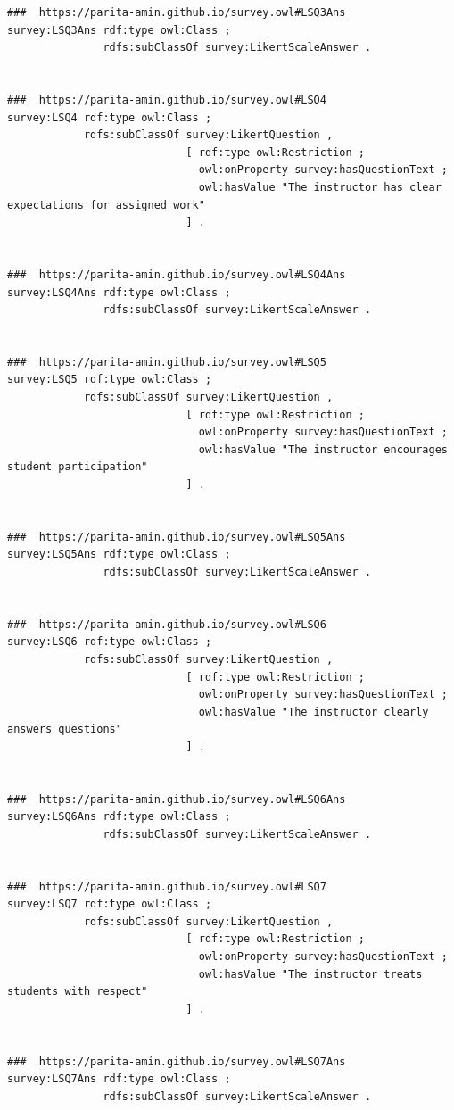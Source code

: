 \begin{lstlisting}
###  https://parita-amin.github.io/survey.owl#LSQ3Ans
survey:LSQ3Ans rdf:type owl:Class ;
               rdfs:subClassOf survey:LikertScaleAnswer .


###  https://parita-amin.github.io/survey.owl#LSQ4
survey:LSQ4 rdf:type owl:Class ;
            rdfs:subClassOf survey:LikertQuestion ,
                            [ rdf:type owl:Restriction ;
                              owl:onProperty survey:hasQuestionText ;
                              owl:hasValue "The instructor has clear expectations for assigned work"
                            ] .


###  https://parita-amin.github.io/survey.owl#LSQ4Ans
survey:LSQ4Ans rdf:type owl:Class ;
               rdfs:subClassOf survey:LikertScaleAnswer .


###  https://parita-amin.github.io/survey.owl#LSQ5
survey:LSQ5 rdf:type owl:Class ;
            rdfs:subClassOf survey:LikertQuestion ,
                            [ rdf:type owl:Restriction ;
                              owl:onProperty survey:hasQuestionText ;
                              owl:hasValue "The instructor encourages student participation"
                            ] .


###  https://parita-amin.github.io/survey.owl#LSQ5Ans
survey:LSQ5Ans rdf:type owl:Class ;
               rdfs:subClassOf survey:LikertScaleAnswer .


###  https://parita-amin.github.io/survey.owl#LSQ6
survey:LSQ6 rdf:type owl:Class ;
            rdfs:subClassOf survey:LikertQuestion ,
                            [ rdf:type owl:Restriction ;
                              owl:onProperty survey:hasQuestionText ;
                              owl:hasValue "The instructor clearly answers questions"
                            ] .


###  https://parita-amin.github.io/survey.owl#LSQ6Ans
survey:LSQ6Ans rdf:type owl:Class ;
               rdfs:subClassOf survey:LikertScaleAnswer .


###  https://parita-amin.github.io/survey.owl#LSQ7
survey:LSQ7 rdf:type owl:Class ;
            rdfs:subClassOf survey:LikertQuestion ,
                            [ rdf:type owl:Restriction ;
                              owl:onProperty survey:hasQuestionText ;
                              owl:hasValue "The instructor treats students with respect"
                            ] .


###  https://parita-amin.github.io/survey.owl#LSQ7Ans
survey:LSQ7Ans rdf:type owl:Class ;
               rdfs:subClassOf survey:LikertScaleAnswer .



\end{lstlisting}
